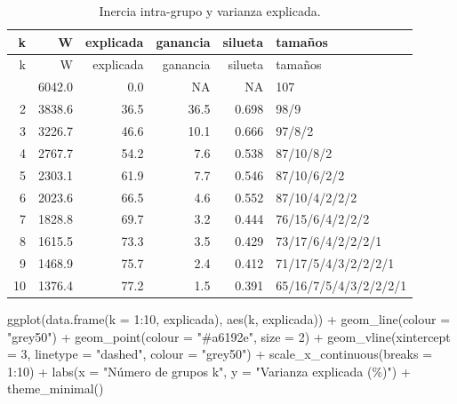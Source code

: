\documentclass[oneside, openany, fontset=libertinus]{mitthesis}
\newenvironment{Shaded}{\begin{snugshade}}{\end{snugshade}}
\newcommand{\AttributeTok}[1]{\textcolor[rgb]{0.40,0.45,0.13}{#1}}
\newcommand{\DecValTok}[1]{\textcolor[rgb]{0.68,0.00,0.00}{#1}}
\newcommand{\FunctionTok}[1]{\textcolor[rgb]{0.28,0.35,0.67}{#1}}
\newcommand{\NormalTok}[1]{\textcolor[rgb]{0.00,0.23,0.31}{#1}}
\newcommand{\SpecialCharTok}[1]{\textcolor[rgb]{0.37,0.37,0.37}{#1}}
\newcommand{\StringTok}[1]{\textcolor[rgb]{0.13,0.47,0.30}{#1}}
\begin{document}
\Needspace{3.07in}

\begin{longtable}[]{@{}rrrrrl@{}}
\caption{Inercia intra-grupo y varianza explicada.}\tabularnewline
\toprule\noalign{}
k & W & explicada & ganancia & silueta & tamaños \\
\midrule\noalign{}
\endfirsthead
\toprule\noalign{}
k & W & explicada & ganancia & silueta & tamaños \\
\midrule\noalign{}
\endhead
\bottomrule\noalign{}
\endlastfoot
1 & 6042.0 & 0.0 & NA & NA & 107 \\
2 & 3838.6 & 36.5 & 36.5 & 0.698 & 98/9 \\
3 & 3226.7 & 46.6 & 10.1 & 0.666 & 97/8/2 \\
4 & 2767.7 & 54.2 & 7.6 & 0.538 & 87/10/8/2 \\
5 & 2303.1 & 61.9 & 7.7 & 0.546 & 87/10/6/2/2 \\
6 & 2023.6 & 66.5 & 4.6 & 0.552 & 87/10/4/2/2/2 \\
7 & 1828.8 & 69.7 & 3.2 & 0.444 & 76/15/6/4/2/2/2 \\
8 & 1615.5 & 73.3 & 3.5 & 0.429 & 73/17/6/4/2/2/2/1 \\
9 & 1468.9 & 75.7 & 2.4 & 0.412 & 71/17/5/4/3/2/2/2/1 \\
10 & 1376.4 & 77.2 & 1.5 & 0.391 & 65/16/7/5/4/3/2/2/2/1 \\
\end{longtable}

\Needspace{5.02in}

\begin{Shaded}
\begin{Highlighting}[]
\FunctionTok{ggplot}\NormalTok{(}\FunctionTok{data.frame}\NormalTok{(}\AttributeTok{k =} \DecValTok{1}\SpecialCharTok{:}\DecValTok{10}\NormalTok{, explicada), }\FunctionTok{aes}\NormalTok{(k, explicada)) }\SpecialCharTok{+}
  \FunctionTok{geom\_line}\NormalTok{(}\AttributeTok{colour =} \StringTok{"grey50"}\NormalTok{) }\SpecialCharTok{+}
  \FunctionTok{geom\_point}\NormalTok{(}\AttributeTok{colour =} \StringTok{"\#a6192e"}\NormalTok{, }\AttributeTok{size =} \DecValTok{2}\NormalTok{) }\SpecialCharTok{+}
  \FunctionTok{geom\_vline}\NormalTok{(}\AttributeTok{xintercept =} \DecValTok{3}\NormalTok{, }\AttributeTok{linetype =} \StringTok{"dashed"}\NormalTok{,}
             \AttributeTok{colour =} \StringTok{"grey50"}\NormalTok{) }\SpecialCharTok{+}
  \FunctionTok{scale\_x\_continuous}\NormalTok{(}\AttributeTok{breaks =} \DecValTok{1}\SpecialCharTok{:}\DecValTok{10}\NormalTok{) }\SpecialCharTok{+}
  \FunctionTok{labs}\NormalTok{(}\AttributeTok{x =} \StringTok{"Número de grupos k"}\NormalTok{, }\AttributeTok{y =} \StringTok{"Varianza explicada (\%)"}\NormalTok{) }\SpecialCharTok{+}
  \FunctionTok{theme\_minimal}\NormalTok{()}
\end{Highlighting}
\end{Shaded}
\end{document}
